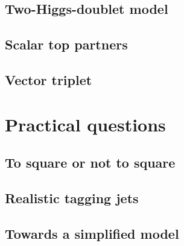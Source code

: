 \subsection{Two-Higgs-doublet model}
\label{sec:validity_2hdm}

\subsection{Scalar top partners}
\label{sec:validity_partners}

\subsection{Vector triplet}
\label{sec:validity_triplet}

\section{Practical questions}
\label{sec:validity_practical_questions}

\subsection{To square or not to square}

\subsection{Realistic tagging jets}

\subsection{Towards a simplified model}
\label{sec:validity_simplified}

